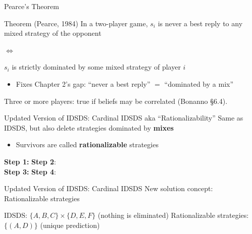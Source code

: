\begin{frame}{Pearce's Theorem}
\begin{block}{Theorem (Pearce, 1984)}
In a two-player game, $s_i$ is never a best reply to any mixed strategy of the opponent
\begin{center}
$\iff$
\end{center}
$s_i$ is strictly dominated by some mixed strategy of player $i$
\end{block}
\bsk
\begin{itemize}
    \item Fixes Chapter 2's gap: ``never a best reply'' $=$ ``dominated by a mix''
\end{itemize}
\vfill
{\footnotesize Three or more players: true if beliefs may be correlated (Bonanno \S6.4).}
\vspace{-0.2in}
\end{frame}

\begin{frame}{Updated Version of IDSDS: Cardinal IDSDS aka ``Rationalizability''}
Same as IDSDS, but also delete strategies dominated by \textbf{mixes}
\begin{itemize}
    \item Survivors are called \textbf{rationalizable} strategies
\end{itemize}
\bsk
\centering
\begin{matrixgame}[top={D, E, F}, left={A, B, C}, player names={Player 1, Player 2}]
\end{matrixgame}
\bsk
\raggedright
\textbf{Step 1:} \hspace{0.3in}\textbf{Step 2}: \\[0.25in]
\textbf{Step 3:} \hspace{0.7in} \textbf{Step 4}: 
\end{frame}


\begin{frame}{Updated Version of IDSDS: Cardinal IDSDS}
New solution concept: Rationalizable strategies
\bsk
\centering
\begin{matrixgame}[top={D, E, F}, left={A, B, C}, player names={Player 1, Player 2}]
\end{matrixgame}
\bsk
\raggedright
IDSDS: $\{A,B,C\}\times\{D,E,F\}$ (nothing is eliminated)
\bsk
Rationalizable strategies: $\{(A,D)\}$ (unique prediction)

\end{frame}

